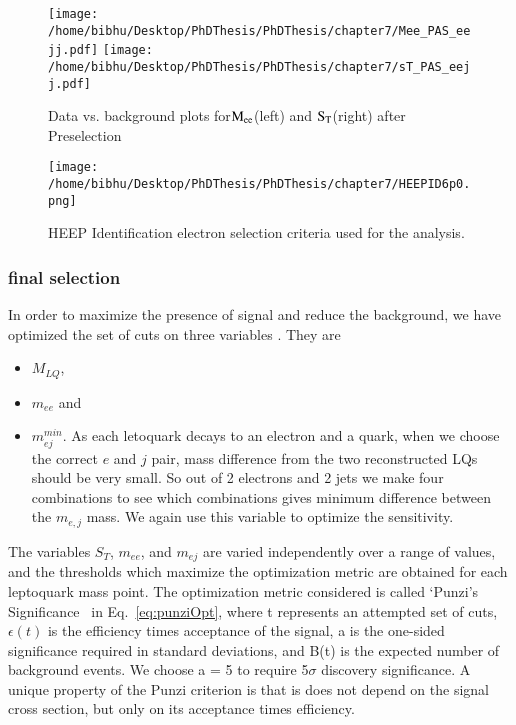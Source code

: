 \begin{figure}[h]
\centering
\texttt{[image: /home/bibhu/Desktop/PhDThesis/PhDThesis/chapter7/Mee\_PAS\_eejj.pdf]}
\texttt{[image: /home/bibhu/Desktop/PhDThesis/PhDThesis/chapter7/sT\_PAS\_eejj.pdf]}
\caption{\label{figure:DatavsBkgPreselection}Data vs. background plots for$\rm M_{ee}$(left) and $\rm S_{T}$(right) after Preselection}
\end{figure}



\begin{figure}[h]
\begin{center}
\texttt{[image: /home/bibhu/Desktop/PhDThesis/PhDThesis/chapter7/HEEPID6p0.png]}

\caption{\label{fig:HEEPID6p0} HEEP Identification electron selection criteria used for the analysis.}
\end{center}
\end{figure}



\newpage
\subsubsection{final selection}
In order to maximize the presence of signal and reduce the background, we have optimized the set of cuts on three variables . They are 
\begin{itemize}
 \item $M_{LQ}$,
 \item  $m_{ee}$ and
 \item  $m_{ej}^{min}$. As each letoquark decays to an electron and a quark, when we choose the correct $e$ and $j$ pair, mass difference from the two reconstructed LQs should be very small. So out of 2 electrons and 2 jets we make four combinations to see which combinations gives minimum difference between the $m_{e,j}$ mass. We again use this variable to optimize the sensitivity.
\end{itemize}

The variables $S_T$, $m_{ee}$, and $m_{ej}$ are varied independently over a range of values, and the thresholds which maximize the optimization metric are obtained for each leptoquark mass point. The optimization metric considered is called `Punzi's Significance~\cite{PunziSignificance} in Eq.~\ref{eq:punziOpt}, where t represents an attempted set of cuts, $\epsilon(t)$ is the efficiency times acceptance of the signal, a is the one-sided significance required in standard deviations, and B(t) is the expected number of background events. We choose a = 5 to require 5$\sigma$ discovery significance. A unique property of the Punzi criterion is that is does not depend on the signal cross section, but only on its acceptance times efficiency. 

